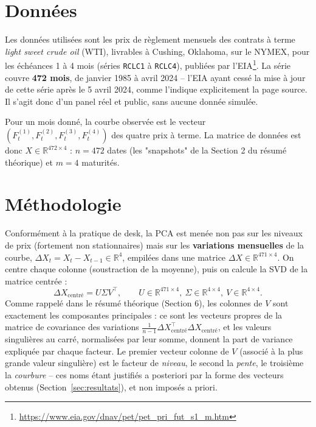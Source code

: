 \documentclass[11pt,a4paper]{article}
\newcommand{\R}{\mathbb{R}}
\begin{document}
\section{Données}

Les données utilisées sont les prix de règlement mensuels des contrats à terme \emph{light sweet crude oil} (WTI), livrables à Cushing, Oklahoma, sur le NYMEX, pour les échéances 1 à 4 mois (séries \texttt{RCLC1} à \texttt{RCLC4}), publiées par l'EIA\footnote{\url{https://www.eia.gov/dnav/pet/pet_pri_fut_s1_m.htm}}. La série couvre \textbf{472 mois}, de janvier 1985 à avril 2024 -- l'EIA ayant cessé la mise à jour de cette série après le 5 avril 2024, comme l'indique explicitement la page source. Il s'agit donc d'un panel réel et public, sans aucune donnée simulée.

Pour un mois donné, la courbe observée est le vecteur $(F^{(1)}_t, F^{(2)}_t, F^{(3)}_t, F^{(4)}_t)$ des quatre prix à terme. La matrice de données est donc $X \in \R^{472 \times 4}$ : $n=472$ dates (les "snapshots" de la Section 2 du résumé théorique) et $m=4$ maturités.

\section{Méthodologie}

Conformément à la pratique de desk, la PCA est menée non pas sur les niveaux de prix (fortement non stationnaires) mais sur les \textbf{variations mensuelles} de la courbe, $\Delta X_t = X_t - X_{t-1} \in \R^{4}$, empilées dans une matrice $\Delta X \in \R^{471 \times 4}$. On centre chaque colonne (soustraction de la moyenne), puis on calcule la SVD de la matrice centrée :
\begin{equation}
\Delta X_{\text{centré}} = U \Sigma V^{\top}, \qquad U \in \R^{471\times 4},\ \Sigma \in \R^{4\times4},\ V \in \R^{4\times 4}.
\end{equation}
Comme rappelé dans le résumé théorique (Section 6), les colonnes de $V$ sont exactement les composantes principales : ce sont les vecteurs propres de la matrice de covariance des variations $\frac{1}{n-1}\Delta X_{\text{centré}}^{\top}\Delta X_{\text{centré}}$, et les valeurs singulières au carré, normalisées par leur somme, donnent la part de variance expliquée par chaque facteur. Le premier vecteur colonne de $V$ (associé à la plus grande valeur singulière) est le facteur de \emph{niveau}, le second la \emph{pente}, le troisième la \emph{courbure} -- ces noms étant justifiés a posteriori par la forme des vecteurs obtenus (Section~\ref{sec:resultats}), et non imposés a priori.
\end{document}
